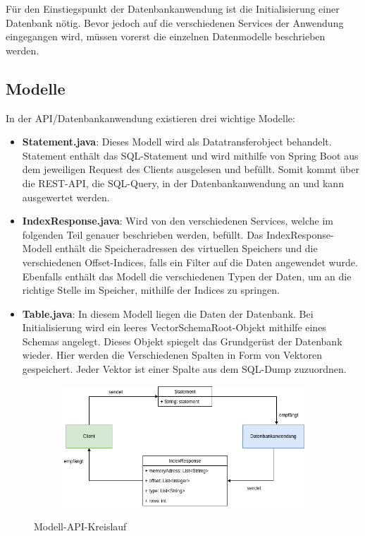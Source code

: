 Für den Einstiegspunkt der Datenbankanwendung ist die Initialisierung einer Datenbank nötig. Bevor jedoch auf die verschiedenen Services der Anwendung eingegangen wird, müssen vorerst die einzelnen Datenmodelle beschrieben werden. 

\subsection{Modelle}
\label{Modelle}

In der API/Datenbankanwendung existieren drei wichtige Modelle:

\begin{itemize}
 \item \textbf{Statement.java}: Dieses Modell wird als Datatransferobject behandelt. Statement enthält das SQL-Statement und wird mithilfe von Spring Boot aus dem jeweiligen Request des Clients ausgelesen und befüllt. Somit kommt über die REST-API, die SQL-Query, in der Datenbankanwendung an und kann ausgewertet werden.
 \item \textbf{IndexResponse.java}: Wird von den verschiedenen Services, welche im folgenden Teil genauer beschrieben werden, befüllt. Das IndexResponse-Modell enthält die Speicheradressen des virtuellen Speichers und die verschiedenen Offset-Indices, falls ein Filter auf die Daten angewendet wurde. Ebenfalls enthält das Modell die verschiedenen Typen der Daten, um an die richtige Stelle im Speicher, mithilfe der Indices zu springen.
 \item \textbf{Table.java}: In diesem Modell liegen die Daten der Datenbank. Bei Initialisierung wird ein leeres VectorSchemaRoot-Objekt mithilfe eines Schemas angelegt. Dieses Objekt spiegelt das Grundgerüst der Datenbank wieder. Hier werden die Verschiedenen Spalten in Form von Vektoren gespeichert. Jeder Vektor ist einer Spalte aus dem SQL-Dump zuzuordnen.
\end{itemize}

\begin{figure}[h]
  \centering
  \begin{subfigure}[b]{1.0\textwidth}
    \includegraphics[width=1.0\linewidth]{img/sendrecieve}
  \end{subfigure}
  \caption{Modell-API-Kreislauf}
  \label{graf_2}
\end{figure}

